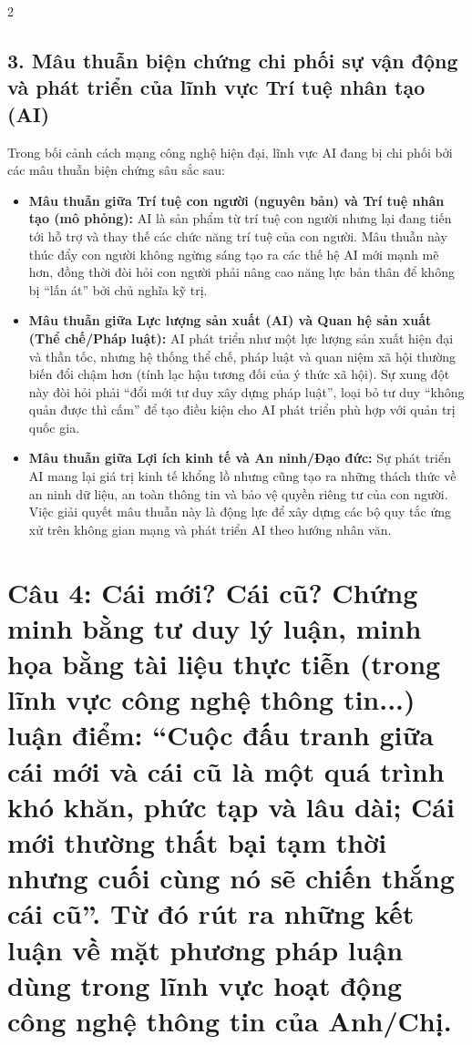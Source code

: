 \documentclass[9pt,a4paper]{extarticle}
\begin{document}
\begin{multicols*}{2}
\subsection*{3. Mâu thuẫn biện chứng chi phối sự vận động và phát triển của lĩnh vực Trí tuệ nhân tạo (AI)}

Trong bối cảnh cách mạng công nghệ hiện đại, lĩnh vực AI đang bị chi phối bởi các mâu thuẫn biện chứng sâu sắc sau:

\begin{itemize}
\item \textbf{Mâu thuẫn giữa Trí tuệ con người (nguyên bản) và Trí tuệ nhân tạo (mô phỏng):} AI là sản phẩm từ trí tuệ con người nhưng lại đang tiến tới hỗ trợ và thay thế các chức năng trí tuệ của con người. Mâu thuẫn này thúc đẩy con người không ngừng sáng tạo ra các thế hệ AI mới mạnh mẽ hơn, đồng thời đòi hỏi con người phải nâng cao năng lực bản thân để không bị ``lấn át'' bởi chủ nghĩa kỹ trị.
\item \textbf{Mâu thuẫn giữa Lực lượng sản xuất (AI) và Quan hệ sản xuất (Thể chế/Pháp luật):} AI phát triển như một lực lượng sản xuất hiện đại và thần tốc, nhưng hệ thống thể chế, pháp luật và quan niệm xã hội thường biến đổi chậm hơn (tính lạc hậu tương đối của ý thức xã hội). Sự xung đột này đòi hỏi phải ``đổi mới tư duy xây dựng pháp luật'', loại bỏ tư duy ``không quản được thì cấm'' để tạo điều kiện cho AI phát triển phù hợp với quản trị quốc gia.
\item \textbf{Mâu thuẫn giữa Lợi ích kinh tế và An ninh/Đạo đức:} Sự phát triển AI mang lại giá trị kinh tế khổng lồ nhưng cũng tạo ra những thách thức về an ninh dữ liệu, an toàn thông tin và bảo vệ quyền riêng tư của con người. Việc giải quyết mâu thuẫn này là động lực để xây dựng các bộ quy tắc ứng xử trên không gian mạng và phát triển AI theo hướng nhân văn.
\end{itemize}

\section*{Câu 4: Cái mới? Cái cũ? Chứng minh bằng tư duy lý luận, minh họa bằng tài liệu thực tiễn (trong lĩnh vực công nghệ thông tin...) luận điểm: ``Cuộc đấu tranh giữa cái mới và cái cũ là một quá trình khó khăn, phức tạp và lâu dài; Cái mới thường thất bại tạm thời nhưng cuối cùng nó sẽ chiến thắng cái cũ''. Từ đó rút ra những kết luận về mặt phương pháp luận dùng trong lĩnh vực hoạt động công nghệ thông tin của Anh/Chị.}


\end{multicols*}
\end{document}
